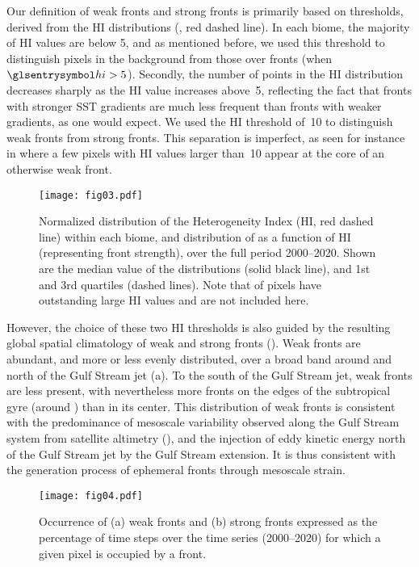 Our definition of weak fronts and strong fronts is primarily based on thresholds, derived from the HI distributions (, red dashed line).
In each biome, the majority of HI values are below 5, and as mentioned before, we used this threshold to distinguish pixels in the background from those over fronts (when \(\am{hi} > 5\)).
Secondly, the number of points in the HI distribution decreases sharply as the HI value increases above~5, reflecting the fact that fronts with stronger SST gradients are much less frequent than fronts with weaker gradients, as one would expect.
We used the HI threshold of~10 to distinguish weak fronts from strong fronts.
This separation is imperfect, as seen for instance in  where a few pixels with HI values larger than~10 appear at the core of an otherwise weak front.

\begin{figure*}
  \centering
  \texttt{[image: fig03.pdf]}
  \caption[Distribution of Chl-\textit{a} against HI]{
    Normalized distribution of the Heterogeneity Index (HI, red dashed line) within each biome, and distribution of  as a function of HI (representing front strength), over the full period 2000--2020.
    Shown are the median value of the  distributions (solid black line), and 1st and 3rd quartiles (dashed lines).
    Note that  of pixels have outstanding large HI values and are not included here.
  }%
  \label{fig:chl-vs-hi}
\end{figure*}

However, the choice of these two HI thresholds is also guided by the resulting global spatial climatology of weak and strong fronts ().
Weak fronts are abundant, and more or less evenly distributed, over a broad band around and north of the Gulf Stream jet (a).
To the south of the Gulf Stream jet, weak fronts are less present, with nevertheless more fronts on the edges of the subtropical gyre (around ) than in its center.
This distribution of weak fronts is consistent with the predominance of mesoscale variability observed along the Gulf Stream system from satellite altimetry (\cite{zhai_2008}), and the injection of eddy kinetic energy north of the Gulf Stream jet by the Gulf Stream extension.
It is thus consistent with the generation process of ephemeral fronts through mesoscale strain.

\begin{figure*}
  \centering
  \texttt{[image: fig04.pdf]}
  \caption[Occurrence map of strong and weak fronts]{
    Occurrence of (a) weak fronts and (b) strong fronts expressed as the percentage of time steps over the time series (2000--2020) for which a given pixel is occupied by a front.
  }%
  \label{fig:frt-occurrence}
\end{figure*}

